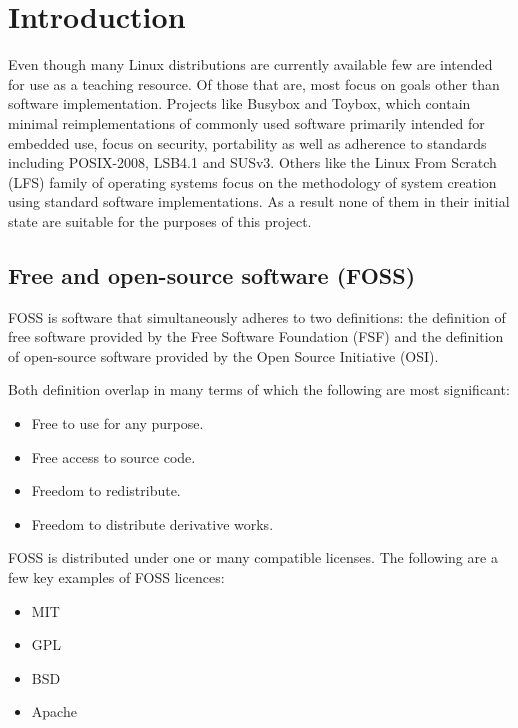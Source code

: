 \section{Introduction}\label{Introduction}

Even though many Linux distributions are currently available few are intended for use as a teaching resource. Of those that are, most focus on goals other than software implementation. Projects like Busybox and Toybox, which contain minimal reimplementations of commonly used software primarily intended for embedded use, focus on security, portability as well as adherence to standards including POSIX-2008, LSB4.1 and SUSv3. Others like the Linux From Scratch (LFS) family of operating systems focus on the methodology of system creation using standard software implementations. As a result none of them in their initial state are suitable for the purposes of this project.

\subsection{Free and open-source software (FOSS)}

FOSS is software that simultaneously adheres to two definitions: the definition of free software provided by the Free Software Foundation (FSF) and the definition of open-source software provided by the Open Source Initiative (OSI).

Both definition overlap in many terms of which the following are most significant:

\begin{itemize}
    \item Free to use for any purpose.
    \item Free access to source code.
    \item Freedom to redistribute.
    \item Freedom to distribute derivative works.
\end{itemize}

FOSS is distributed under one or many compatible licenses. The following are a few key examples of FOSS licences:

\begin{itemize}
    \item MIT
    \item GPL
    \item BSD
    \item Apache
\end{itemize}

